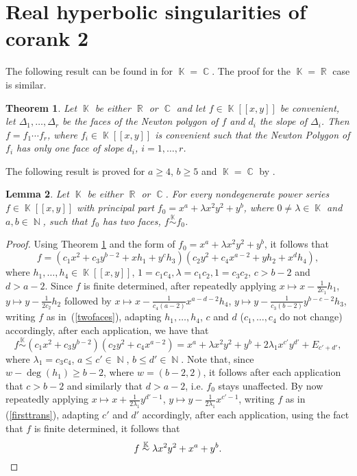 \documentclass[noend]{amsproc}
\newtheorem{theorem}{Theorem}
\newtheorem{lemma}[theorem]{Lemma}
\theoremstyle{definition}
\DeclareMathOperator{\N}{\mathbb{N}}
\DeclareMathOperator{\R}{\mathbb{R}}
\DeclareMathOperator{\C}{\mathbb{C}}
\DeclareMathOperator{\K}{\mathbb{K}}
\begin{document}
\section{Real hyperbolic singularities of corank 2}
The following result can be found in \citet{PdJ2000} for $\K=\C$. The proof for
the $\K=\R$ case is similar.

\begin{theorem}\label{faces}
Let $\K$ be either $\R$ or $\C$ and let $f\in\K[[x,y]]$ be convenient, let
$\Delta_1,\ldots,\Delta_r$ be the faces of the Newton polygon of $f$ and $d_i$
the slope of $\Delta_i$. Then $f=f_1\cdots f_r$, where $f_i\in\K[[x,y]]$ is
convenient such that the Newton Polygon of $f_i$ has only one face of slope
$d_i$, $i=1,\ldots,r$.
\end{theorem}

The following result is proved for $a\ge 4$, $b\ge 5$ and $\K=\C$ by
\citet{A1974}.

\begin{lemma}\label{principalpart}
Let $\K$ be either $\R$ or $\C$. For every nondegenerate power series
$f\in\K[[x,y]]$ with principal part $f_0=x^a+\lambda x^2y^2+y^b$, where
$0\neq\lambda\in\K$ and $a,b\in\N$, such that $f_0$ has two faces,
$f\overset{\K}\sim f_0$.
\end{lemma}
\begin{proof}
Using Theorem \ref{faces} and the form of $f_0=x^a+\lambda x^2y^2+y^b$, it
follows that
\begin{equation}\label{twofaces}
f=(c_1x^2+c_3y^{b-2}+xh_1+y^ch_3)(c_2y^2+c_4x^{a-2}+yh_2+x^dh_4),
\end{equation}
where $h_1,\ldots,h_4\in\K[[x,y]]$, $1=c_1c_4, \lambda=c_1c_2, 1=c_3c_2$,
$c>b-2$ and $d>a-2$. Since $f$ is finite determined, after repeatedly applying
$x\mapsto x-\frac{1}{2c_1}h_1$, $y\mapsto y-\frac{1}{2c_2}h_2$ followed by
$x\mapsto x-\frac{1}{c_4(a-2)}x^{a-d-2}h_4$,
$y\mapsto y-\frac{1}{c_3(b-2)}y^{b-c-2} h_3$, writing $f$ as
in~(\ref{twofaces}), adapting $h_1,\ldots,h_4$, $c$ and $d$ ($c_1,\ldots,c_4$
do not change) accordingly, after each application, we have that
\begin{equation}
f\overset{\K}\sim (c_1x^2+c_3y^{b-2})(c_2y^2+c_4x^{a-2})
=x^a+\lambda x^2y^2+y^b+2\lambda_1x^{c'}y^{d'}+E_{c'+d'},\label{firsttrans}
\end{equation}
where $\lambda_1=c_3c_4$, $a\le c'\in\N$, $b\le d'\in\N$. Note that, since
$w-\deg(h_1)\ge b-2$, where $w=(b-2,2)$, it follows after each application
that $c>b-2$ and similarly that $d>a-2$, i.e. $f_0$ stays unaffected. By now
repeatedly applying $x\mapsto x+\frac{1}{2\lambda_1}y^{d'-1}$,
$y\mapsto y-\frac{1}{2\lambda_1}x^{c'-1}$, writing $f$ as in
(\ref{firsttrans}), adapting $c'$ and $d'$ accordingly, after each application,
using the fact that $f$ is finite determined, it follows that
\[f\overset{\K}\sim \lambda x^2y^2+x^a+y^b.\qedhere\]
\end{proof}
\end{document}
